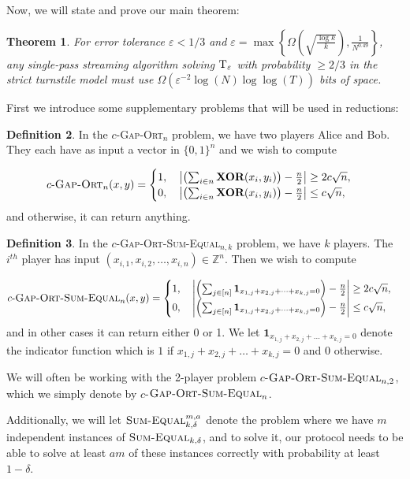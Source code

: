 \documentclass[11pt]{article}
\numberwithin{equation}{section}
\newtheorem{theorem}{Theorem}[section]
\theoremstyle{definition}
\newtheorem{definition}[theorem]{Definition}
\theoremstyle{plain}
\newcommand{\Z}{\mathbb Z}
\newcommand{\set}[1]{{\left \{{#1} \right \}}}
\newcommand{\gap}{\ensuremath{\varepsilon}}
\newcommand{\bigomega}[1]{\ensuremath{{\Omega \left( {#1} \right)}}}
\newcommand{\sumequal}{\textsc{Sum-Equal} }
\newcommand{\hest}{ \textsc{T} }
\newcommand{\go}{\textsc{Gap-Ort}}
\newcommand{\gose}{\textsc{Gap-Ort-Sum-Equal}}
\begin{document}
Now, we will state and prove our main theorem:

\begin{theorem}\label{thm:L0}
	For error tolerance $\gap <1/3$ and $\gap=\max\set{\bigomega{ \sqrt{\frac{\log k}{k}}}, \frac{1}{{N}^{0.49}}}$, 
	any single-pass streaming algorithm solving $\hest_\gap$ with probability $\ge 2/3$ in the strict turnstile model
	must use $\bigomega{\gap^{-2}\log (N)\log\log(T)}$ bits of space.
\end{theorem}


First we introduce some supplementary problems that will be used in reductions:

\begin{definition}
In the $c$-\go$_n$ problem, we have two players Alice and Bob. They each have as input a vector in $\{0,1\}^n$ and we wish to compute 

$$c\text{-}\go_n(x,y) = \begin{cases}
1, \quad \left|\left(\sum_{i \in n} \textbf{XOR}(x_i,y_i)\right) - \frac{n}{2}\right| \ge 2c\sqrt{n},\\
0, \quad \left|\left(\sum_{i \in n}  \textbf{XOR}(x_i,y_i)\right) - \frac{n}{2}\right| \le c\sqrt{n},\\
\end{cases}
$$
and otherwise, it can return anything.
\end{definition}
{\color{black}
\begin{definition}
In the $c$-\gose$_{n,k}$ problem, we have $k$ players. The $i^{th}$ player has input $(x_{i,1}, x_{i,2}, \dots, x_{i,n}) \in \Z^n$. Then we wish to compute

$$c\text{-}\gose_n(x,y) = \begin{cases}
1, \quad \left|\left(\sum_{j \in [n]} \mathbf{1}_{x_{1,j} + x_{2,j} + \dots + x_{k,j}= 0}\right) - \frac{n}{2}\right| \ge 2c\sqrt{n},\\
0, \quad \left|\left(\sum_{j \in [n]} \mathbf{1}_{x_{1,j} + x_{2,j} + \dots + x_{k,j}= 0}\right) - \frac{n}{2}\right| \le c\sqrt{n},\\
\end{cases}
$$
and in other cases it can return either 0 or 1. We let $\mathbf{1}_{x_{1,j} + x_{2,j} + \dots + x_{k,j}= 0}$ denote the indicator function which is $1$ if $x_{1,j} + x_{2,j} + \dots + x_{k,j}= 0$ and $0$ otherwise.
%

We will often be working with the 2-player problem $c$-$\gose_{n,2}$, which we simply denote by $c$-$\gose_n$.
\end{definition}
}
Additionally, we will let $\sumequal_{k,\delta}^{m,a}$ denote the problem where we have $m$ independent instances of $\sumequal_{k,\delta}$, and to solve it, our protocol needs to be able to solve at least $am$ of these instances correctly with probability at least $1-\delta$.
\end{document}
